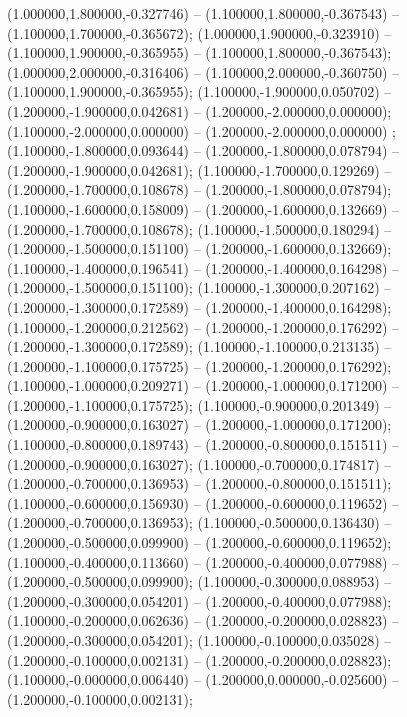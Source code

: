  (1.000000,1.800000,-0.327746) -- (1.100000,1.800000,-0.367543) -- (1.100000,1.700000,-0.365672);
 (1.000000,1.900000,-0.323910) -- (1.100000,1.900000,-0.365955) -- (1.100000,1.800000,-0.367543);
 (1.000000,2.000000,-0.316406) -- (1.100000,2.000000,-0.360750) -- (1.100000,1.900000,-0.365955);
 (1.100000,-1.900000,0.050702) -- (1.200000,-1.900000,0.042681) -- (1.200000,-2.000000,0.000000);
 (1.100000,-2.000000,0.000000) -- (1.200000,-2.000000,0.000000) ;
 (1.100000,-1.800000,0.093644) -- (1.200000,-1.800000,0.078794) -- (1.200000,-1.900000,0.042681);
 (1.100000,-1.700000,0.129269) -- (1.200000,-1.700000,0.108678) -- (1.200000,-1.800000,0.078794);
 (1.100000,-1.600000,0.158009) -- (1.200000,-1.600000,0.132669) -- (1.200000,-1.700000,0.108678);
 (1.100000,-1.500000,0.180294) -- (1.200000,-1.500000,0.151100) -- (1.200000,-1.600000,0.132669);
 (1.100000,-1.400000,0.196541) -- (1.200000,-1.400000,0.164298) -- (1.200000,-1.500000,0.151100);
 (1.100000,-1.300000,0.207162) -- (1.200000,-1.300000,0.172589) -- (1.200000,-1.400000,0.164298);
 (1.100000,-1.200000,0.212562) -- (1.200000,-1.200000,0.176292) -- (1.200000,-1.300000,0.172589);
 (1.100000,-1.100000,0.213135) -- (1.200000,-1.100000,0.175725) -- (1.200000,-1.200000,0.176292);
 (1.100000,-1.000000,0.209271) -- (1.200000,-1.000000,0.171200) -- (1.200000,-1.100000,0.175725);
 (1.100000,-0.900000,0.201349) -- (1.200000,-0.900000,0.163027) -- (1.200000,-1.000000,0.171200);
 (1.100000,-0.800000,0.189743) -- (1.200000,-0.800000,0.151511) -- (1.200000,-0.900000,0.163027);
 (1.100000,-0.700000,0.174817) -- (1.200000,-0.700000,0.136953) -- (1.200000,-0.800000,0.151511);
 (1.100000,-0.600000,0.156930) -- (1.200000,-0.600000,0.119652) -- (1.200000,-0.700000,0.136953);
 (1.100000,-0.500000,0.136430) -- (1.200000,-0.500000,0.099900) -- (1.200000,-0.600000,0.119652);
 (1.100000,-0.400000,0.113660) -- (1.200000,-0.400000,0.077988) -- (1.200000,-0.500000,0.099900);
 (1.100000,-0.300000,0.088953) -- (1.200000,-0.300000,0.054201) -- (1.200000,-0.400000,0.077988);
 (1.100000,-0.200000,0.062636) -- (1.200000,-0.200000,0.028823) -- (1.200000,-0.300000,0.054201);
 (1.100000,-0.100000,0.035028) -- (1.200000,-0.100000,0.002131) -- (1.200000,-0.200000,0.028823);
 (1.100000,-0.000000,0.006440) -- (1.200000,0.000000,-0.025600) -- (1.200000,-0.100000,0.002131);
